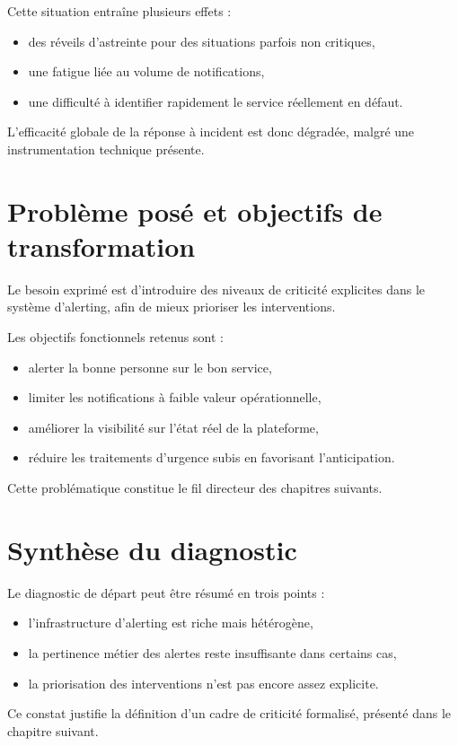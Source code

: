 Cette situation entraîne plusieurs effets :
\begin{itemize}
	\item des réveils d'astreinte pour des situations parfois non critiques,
	\item une fatigue liée au volume de notifications,
	\item une difficulté à identifier rapidement le service réellement en défaut.
\end{itemize}

L'efficacité globale de la réponse à incident est donc dégradée, malgré une instrumentation technique présente.

\section{Problème posé et objectifs de transformation}

Le besoin exprimé est d'introduire des niveaux de criticité explicites dans le système d'alerting, afin de mieux
prioriser les interventions.

Les objectifs fonctionnels retenus sont :
\begin{itemize}
	\item alerter la bonne personne sur le bon service,
	\item limiter les notifications à faible valeur opérationnelle,
	\item améliorer la visibilité sur l'état réel de la plateforme,
	\item réduire les traitements d'urgence subis en favorisant l'anticipation.
\end{itemize}

Cette problématique constitue le fil directeur des chapitres suivants.

\section{Synthèse du diagnostic}

Le diagnostic de départ peut être résumé en trois points :
\begin{itemize}
	\item l'infrastructure d'alerting est riche mais hétérogène,
	\item la pertinence métier des alertes reste insuffisante dans certains cas,
	\item la priorisation des interventions n'est pas encore assez explicite.
\end{itemize}

Ce constat justifie la définition d'un cadre de criticité formalisé, présenté dans le chapitre suivant.